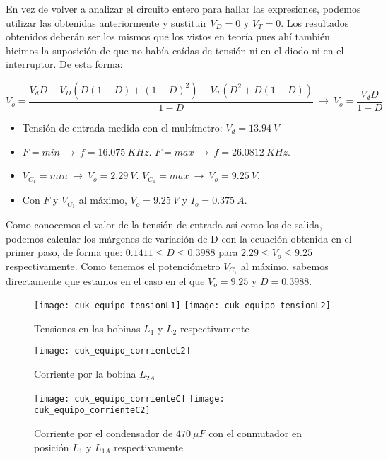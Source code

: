 \documentclass[10pt]{article}
\begin{document}
	En vez de volver a analizar el circuito entero para hallar las expresiones, podemos utilizar las obtenidas anteriormente y sustituir $V_D=0$ y $V_T=0$. Los resultados obtenidos deberán ser los mismos que los vistos en teoría pues ahí también hicimos la suposición de que no había caídas de tensión ni en el diodo ni en el interruptor. De esta forma:
	
	$$V_o=\frac{V_dD-V_D(D(1-D)+(1-D)^2)-V_T(D^2+D(1-D))}{1-D}\ \rightarrow\ V_o=\frac{V_dD}{1-D}$$

	\begin{itemize}
		\item Tensión de entrada medida con el multímetro: $V_d=13.94\ V$
		\item $F=min\ \rightarrow\ f=16.075\ KHz$. $F=max\ \rightarrow\ f=26.0812\ KHz$.
		\item $V_{C_1}=min\ \rightarrow\ V_o=2.29\ V$. $V_{C_1}=max\ \rightarrow\ V_o=9.25\ V$.
		\item Con $F$ y $V_{C_1}$ al máximo, $V_o=9.25\ V$ y $I_o=0.375\ A$.
	\end{itemize}

	Como conocemos el valor de la tensión de entrada así como los de salida, podemos calcular los márgenes de variación de D con la ecuación obtenida en el primer paso, de forma que: $0.1411\leq D \leq 0.3988$ para $2.29\leq V_o\leq 9.25$ respectivamente. Como tenemos el potenciómetro $V_{C_1}$ al máximo, sabemos directamente que estamos en el caso en el que $V_o=9.25$ y $D=0.3988$. 

	\begin{figure}[H]
		\begin{center}
			\texttt{[image: cuk\_equipo\_tensionL1]}
			\texttt{[image: cuk\_equipo\_tensionL2]}
		\end{center}\caption{Tensiones en las bobinas $L_1$ y $L_2$ respectivamente}
	\end{figure}
	
	\begin{figure}[H]
		\begin{center}
			\texttt{[image: cuk\_equipo\_corrienteL2]}
		\end{center}\caption{Corriente por la bobina $L_{2A}$}
	\end{figure}
	
	\begin{figure}[H]
		\begin{center}
			\texttt{[image: cuk\_equipo\_corrienteC]}
						\texttt{[image: cuk\_equipo\_corrienteC2]}
		\end{center}\caption{Corriente por el condensador de $470\ \mu F$ con el conmutador en posición $L_1$ y $L_{1A}$ respectivamente}
	\end{figure}
\end{document}
